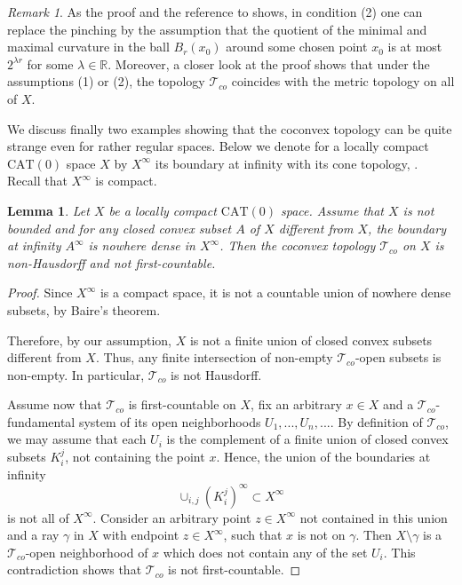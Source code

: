 \documentclass[12pt,leqno]{amsart}
\numberwithin{equation}{section}
\newtheorem{lem}[thm]{Lemma}
\theoremstyle{remark}
\newtheorem{rem}[thm]{Remark}
\newcommand{\CAT}{\mathrm{CAT}}
\newcommand{\R}{\mathbb{R}}
\begin{document}
\begin{rem}
	As the proof and the reference to \cite{Borbely} shows, in condition (2) one can replace the pinching by the assumption that the quotient of the minimal and maximal curvature in the ball $B_r(x_0)$ around some chosen point $x_0$ is at most $2^{\lambda r}$ for some $\lambda \in \R$. Moreover, a closer look at the proof shows that under the assumptions (1) or (2),
	the topology $\mathcal T_{co}$ coincides with the metric topology on all of $X$.	 
\end{rem}

We discuss finally two examples showing that the coconvex topology can be quite strange even for rather regular spaces. Below we denote for a locally compact $\CAT(0)$ space $X$ by $X^{\infty}$ its boundary at infinity with its cone topology, \cite{BH}. Recall that $X^{\infty}$ is compact.

\begin{lem} \label{lem: anc}
	Let $X$ be a locally compact $\CAT(0)$ space. Assume that $X$ is not bounded and for any closed convex subset $A$ of $X$ different from $X$, the boundary at infinity $A^{\infty}$ is nowhere dense in $X^{\infty}$. Then the coconvex topology $\mathcal T_{co}$ on $X$ is non-Hausdorff and not first-countable.
\end{lem}

\begin{proof}
Since $X^{\infty}$ is a compact space, it is not a countable union of nowhere dense subsets, by Baire's theorem. 

Therefore, by our assumption, $X$ is not a finite union of closed convex subsets different from $X$. Thus, any finite intersection of non-empty $\mathcal T_{co}$-open subsets is non-empty.
In particular, $\mathcal T_{co}$ is not Hausdorff.

Assume now that $\mathcal T_{co}$ is first-countable on $X$, fix an arbitrary $x\in X$ and a $\mathcal T_{co}$-fundamental system of its open neighborhoods $U_1,...,U_n,...$.
By definition of $\mathcal T_{co}$, we may assume 
that each $U_i$ is the complement of a finite union of closed convex subsets $K_i ^j$, not containing the point $x$. Hence, the union of the boundaries at infinity 
$$\cup _{i,j} (K_i ^j ) ^{\infty } \subset X^{\infty}$$
is not all of $X^{\infty}$. Consider an arbitrary point $z\in X^{\infty}$ not contained in this union and a ray $\gamma$ in $X$ with endpoint $z \in X^{\infty}$, such that $x$ is not on $\gamma$. Then $X\setminus \gamma$ is a $\mathcal T_{co}$-open neighborhood of $x$ which does not contain any of the set $U_i$. This contradiction shows that $\mathcal T_{co}$ is not first-countable. 
\end{proof}
\end{document}
